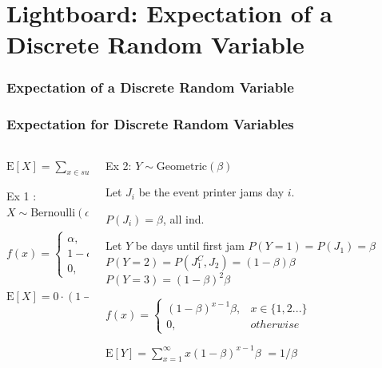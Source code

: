 \documentclass[12pt, block=fill]{beamer}
\newcommand{\E}{\text{E}}
\begin{document}
\section{Lightboard: Expectation of a Discrete Random Variable}

\begin{frame}
  \frametitle{Expectation of a Discrete Random Variable}
\end{frame}


\begin{frame}
  \frametitle{Expectation for Discrete Random Variables}
  \begin{columns}
    \begin{column}{0.5\textwidth}
      $\E[X] = \sum_{x \in supp[X]} xf(x)$ 
  
      Ex 1 : $X \sim \text{Bernoulli}(\alpha)$
  
      $f(x) = \begin{cases}
        \alpha, & x=1\\
        1-\alpha, & x=0\\
        0, &otherwise
      \end{cases}
      $
  
      $\E[X] = 0 \cdot (1-\alpha) + 1 \cdot \alpha = \alpha$
 
       
    \end{column}
    \begin{column}{0.55\textwidth}

      Ex 2: $Y \sim \text{Geometric}(\beta)$

      Let $J_i$ be the event printer jams day $i$.

      $P(J_i) = \beta$, all ind.

      Let $Y$ be days until first jam $P(Y=1) = P(J_1) = \beta$
      $P(Y=2) = P( J_1^C, J_2 ) = (1-\beta) \beta $
      $P(Y=3) = (1-\beta)^2 \beta$

      $f(x) = \begin{cases}
        (1-\beta)^{x-1}\beta , & x \in \{1,2...\} \\
        0, &otherwise
      \end{cases}
      $


      $\E[Y] = \sum_{x = 1}^\infty x (1-\beta)^{x-1} \beta $
      $ = 1/\beta $
    \end{column}
  \end{columns}
\end{frame}
\end{document}
